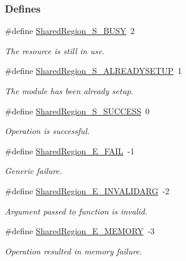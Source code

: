 \subsubsection*{Defines}
\begin{DoxyCompactItemize}
\item 
\#define \hyperlink{_shared_region_8h_a6600547ee6e6f87175f7031004206e9e}{SharedRegion\_\-S\_\-BUSY}~2
\begin{DoxyCompactList}\small\item\em The resource is still in use. \item\end{DoxyCompactList}\item 
\#define \hyperlink{_shared_region_8h_a016c010c7acdf21d0138f54002eb1783}{SharedRegion\_\-S\_\-ALREADYSETUP}~1
\begin{DoxyCompactList}\small\item\em The module has been already setup. \item\end{DoxyCompactList}\item 
\#define \hyperlink{_shared_region_8h_aeb2b620491aa7fb3f25603b651e037a5}{SharedRegion\_\-S\_\-SUCCESS}~0
\begin{DoxyCompactList}\small\item\em Operation is successful. \item\end{DoxyCompactList}\item 
\#define \hyperlink{_shared_region_8h_a38d229410cc0928a0ece957d8b525c5e}{SharedRegion\_\-E\_\-FAIL}~-\/1
\begin{DoxyCompactList}\small\item\em Generic failure. \item\end{DoxyCompactList}\item 
\#define \hyperlink{_shared_region_8h_ae6cbeb3d372c004105fa71df5710cb25}{SharedRegion\_\-E\_\-INVALIDARG}~-\/2
\begin{DoxyCompactList}\small\item\em Argument passed to function is invalid. \item\end{DoxyCompactList}\item 
\#define \hyperlink{_shared_region_8h_a220eacf751625694d91a86b98c03dc8d}{SharedRegion\_\-E\_\-MEMORY}~-\/3
\begin{DoxyCompactList}\small\item\em Operation resulted in memory failure. \item\end{DoxyCompactList}\item 

\end{DoxyCompactItemize}
